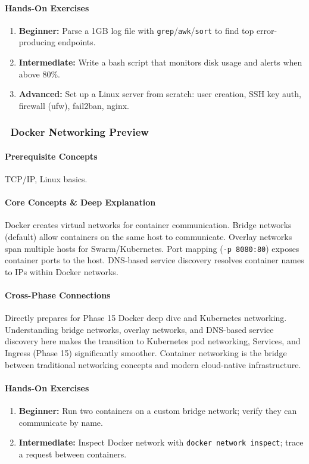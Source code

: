 \documentclass[11pt, a4paper, oneside]{report}
\newcommand{\awareness}[1]{\subsubsection{\texorpdfstring{\fcolorbox{gray!50}{gray!10}{\footnotesize\bfseries\color{gray!50!black} AWARENESS}~#1}{#1}}}
\begin{document}
\paragraph{Hands-On Exercises}
\begin{enumerate}[leftmargin=*]
\item \textbf{Beginner:} Parse a 1GB log file with \texttt{grep}/\texttt{awk}/\texttt{sort} to find top error-producing endpoints.
\item \textbf{Intermediate:} Write a bash script that monitors disk usage and alerts when above 80\%.
\item \textbf{Advanced:} Set up a Linux server from scratch: user creation, SSH key auth, firewall (ufw), fail2ban, nginx.
\end{enumerate}

\awareness{Docker Networking Preview}

\paragraph{Prerequisite Concepts} TCP/IP, Linux basics.

\paragraph{Core Concepts \& Deep Explanation} Docker creates virtual networks for container communication. Bridge networks (default) allow containers on the same host to communicate. Overlay networks span multiple hosts for Swarm/Kubernetes. Port mapping (\texttt{-p 8080:80}) exposes container ports to the host. DNS-based service discovery resolves container names to IPs within Docker networks.

\paragraph{Cross-Phase Connections} Directly prepares for Phase 15 Docker deep dive and Kubernetes networking. Understanding bridge networks, overlay networks, and DNS-based service discovery here makes the transition to Kubernetes pod networking, Services, and Ingress (Phase 15) significantly smoother. Container networking is the bridge between traditional networking concepts and modern cloud-native infrastructure.

\paragraph{Hands-On Exercises}
\begin{enumerate}[leftmargin=*]
\item \textbf{Beginner:} Run two containers on a custom bridge network; verify they can communicate by name.
\item \textbf{Intermediate:} Inspect Docker network with \texttt{docker network inspect}; trace a request between containers.
\end{enumerate}
\end{document}
